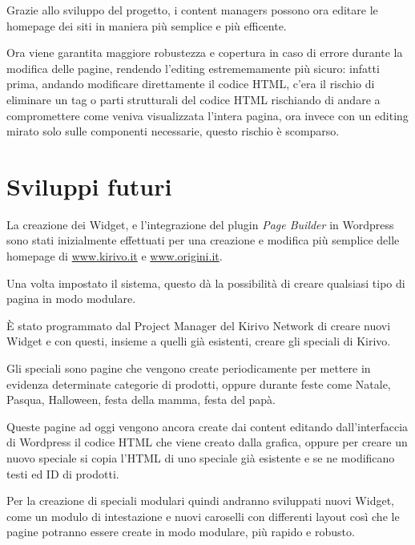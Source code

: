 
Grazie allo sviluppo del progetto, i content managers possono ora editare le
homepage dei siti in maniera più semplice e più efficente.

Ora viene garantita maggiore robustezza e copertura in caso di errore durante la modifica delle pagine,
rendendo l'editing estrememamente più sicuro: infatti prima, andando modificare direttamente il codice HTML, c'era il rischio di eliminare
un tag o parti strutturali del codice HTML rischiando di andare a compromettere come veniva visualizzata l'intera pagina,
ora invece con un editing mirato solo sulle componenti necessarie, questo rischio è scomparso.

\section{Sviluppi futuri}

La creazione dei Widget, e l'integrazione del plugin \emph{Page Builder} in Wordpress sono stati
inizialmente effettuati per una creazione e modifica più semplice delle homepage di \url{www.kirivo.it} 
e \url{www.origini.it}.

Una volta impostato il sistema, questo dà la possibilità di creare qualsiasi tipo di pagina in modo modulare.

È stato programmato dal Project Manager del Kirivo Network di creare nuovi Widget e con questi, insieme a quelli 
già esistenti, creare gli speciali di Kirivo.

Gli speciali sono pagine che vengono create periodicamente per mettere in evidenza determinate categorie di prodotti,
oppure durante feste come Natale, Pasqua, Halloween, festa della mamma, festa del papà.

Queste pagine ad oggi vengono ancora create dai content editando dall'interfaccia di Wordpress il codice HTML che
viene creato dalla grafica, oppure per creare un nuovo speciale si copia l'HTML di uno speciale già esistente e se ne modificano testi
ed ID di prodotti.

Per la creazione di speciali modulari quindi andranno sviluppati nuovi Widget, come un modulo di intestazione
e nuovi caroselli con differenti layout così che le pagine potranno essere create in modo modulare, più rapido
e robusto.

